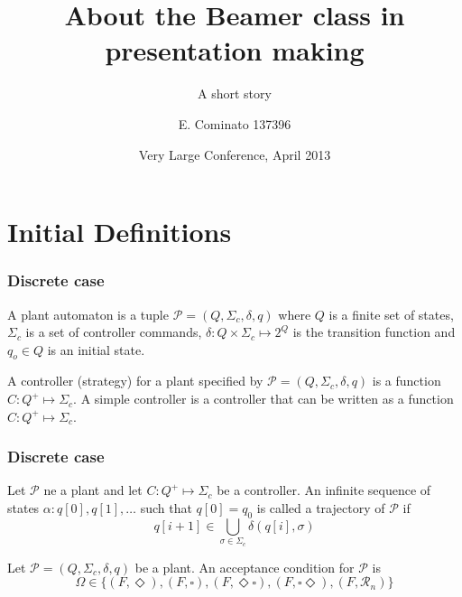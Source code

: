 \documentclass[table]{beamer}
\title[About Beamer] %
{About the Beamer class in presentation making}
\subtitle{A short story}
\author[Enrico] %
{E. Cominato 137396\inst{1}}
\institute %
{
	\inst{1}%
	Dipartimento di Scienze Matematiche, Informatiche e Fisiche\\
	Università degli studi di Udine
}
\date[VLC 2013] %
{Very Large Conference, April 2013}
\begin{document}
\frame{\titlepage}

\section{Initial Definitions}
\begin{frame}
	\frametitle{Discrete case}
	\begin{dfn}[Plant]
		A plant automaton is a tuple $\mathcal{P}=(Q,\Sigma_c,\delta, q)$ where
		$Q$ is a finite set of states, $\Sigma_c$ is a set of controller commands, 
		$\delta:Q \times \Sigma_c \longmapsto 2^Q$ is the transition function and 
		$q_o \in Q$ is an initial state.
	\end{dfn}

	\begin{dfn}[Controllers]
		A controller (strategy) for a plant specified by $\mathcal{P}=(Q,\Sigma_c,\delta, q)$ 
		is a function $C:Q^+\longmapsto \Sigma_c$. A simple controller is a controller that 
		can be written as a function $C:Q^+\longmapsto \Sigma_c$.
	\end{dfn}
\end{frame}

\begin{frame}
	\frametitle{Discrete case}
	\begin{dfn}[Trajectories]
		Let $\mathcal{P}$ ne a plant and let $C:Q^+\longmapsto \Sigma_c$ be a controller. 
		An infinite sequence of states $\alpha:q[0],q[1],\ldots$ such that
		 $q[0]=q_0$ is called a trajectory of $\mathcal{P}$ if 
		$$q[i+1] \in \bigcup_{\sigma \in \Sigma_c}\delta(q[i],\sigma)$$
	\end{dfn}

	\begin{dfn}
		Let $\mathcal{P}=(Q,\Sigma_c,\delta, q)$ be a plant. An acceptance condition for $\mathcal{P}$ is
		$$ \Omega \in \{(F,\Diamond),(F,\square ),(F,\Diamond\square),(F,\square\Diamond),(F,\mathcal{R}_n)\}$$
	\end{dfn}
\end{frame}
\end{document}
